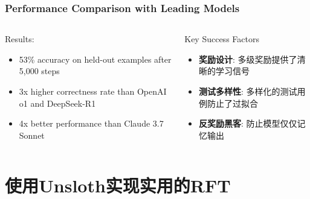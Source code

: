 \documentclass[aspectratio=169]{beamer}
\begin{document}
\begin{frame}[shrink=15]
	\frametitle{Performance Comparison with Leading Models}
	\begin{columns}[T]
		\begin{column}{0.48\textwidth}
			\begin{block}{Results:}
				\begin{itemize}\setlength{\itemsep}{0.3em}
					\item 53\% accuracy on held-out examples after 5,000 steps
					\item 3x higher correctness rate than OpenAI o1 and DeepSeek-R1
					\item 4x better performance than Claude 3.7 Sonnet
				\end{itemize}
			\end{block}
		\end{column}
		\begin{column}{0.48\textwidth}
			\begin{block}{Key Success Factors}
				\begin{itemize}\setlength{\itemsep}{0.3em}
					\item \textbf{奖励设计}: 多级奖励提供了清晰的学习信号
					\item \textbf{测试多样性}: 多样化的测试用例防止了过拟合
					\item \textbf{反奖励黑客}: 防止模型仅仅记忆输出
				\end{itemize}
			\end{block}
		\end{column}
	\end{columns}
\end{frame}

\section{使用Unsloth实现实用的RFT}
\end{document}
